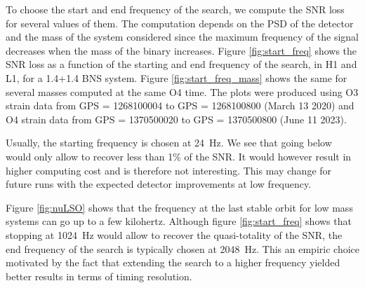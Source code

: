 To choose the start and end frequency of the search, we compute the SNR loss for several values of them.
The computation depends on the PSD of the detector and the mass of the system considered since the maximum frequency of the signal decreases when the mass of the binary increases.
Figure \ref{fig:start_freq} shows the SNR loss as a function of the starting and end frequency of the search, in H1 and L1, for a \SI{1.4}{\msun}+\SI{1.4}{\msun} BNS system.
Figure \ref{fig:start_freq_mass} shows the same for several masses computed at the same O4 time.
The plots were produced using O3 strain data from GPS = 1268100004 to GPS = 1268100800 (March 13 2020) and O4 strain data from GPS = 1370500020 to GPS = 1370500800 (June 11 2023).

Usually, the starting frequency is chosen at \SI{24}{Hz}.
We see that going below would only allow to recover less than 1\% of the SNR.
It would however result in higher computing cost and is therefore not interesting.
This may change for future runs with the expected detector improvements at low frequency. 

Figure \ref{fig:nuLSO} shows that the frequency at the last stable orbit for low mass systems can go up to a few kilohertz.
Although figure \ref{fig:start_freq} shows that stopping at \SI{1024}{Hz} would allow to recover the quasi-totality of the SNR, the end frequency of the search is typically chosen at \SI{2048}{Hz}.
This an empiric choice motivated by the fact that extending the search to a higher frequency yielded better results in terms of timing resolution.

